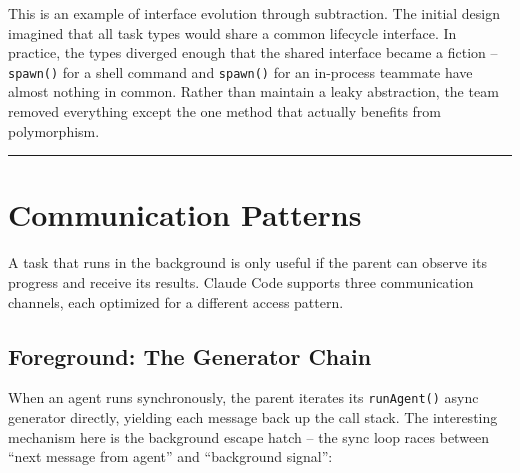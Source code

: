 \documentclass[
  english,
  11pt,
  letterpaper,
]{book}
\begin{document}
This is an example of interface evolution through subtraction. The
initial design imagined that all task types would share a common
lifecycle interface. In practice, the types diverged enough that the
shared interface became a fiction -- \texttt{spawn()} for a shell
command and \texttt{spawn()} for an in-process teammate have almost
nothing in common. Rather than maintain a leaky abstraction, the team
removed everything except the one method that actually benefits from
polymorphism.

\begin{center}\rule{0.5\linewidth}{0.5pt}\end{center}

\section{Communication Patterns}\label{communication-patterns}

A task that runs in the background is only useful if the parent can
observe its progress and receive its results. Claude Code supports three
communication channels, each optimized for a different access pattern.

\subsection{Foreground: The Generator
Chain}\label{foreground-the-generator-chain}

When an agent runs synchronously, the parent iterates its
\texttt{runAgent()} async generator directly, yielding each message back
up the call stack. The interesting mechanism here is the background
escape hatch -- the sync loop races between ``next message from agent''
and ``background signal'':
\end{document}
